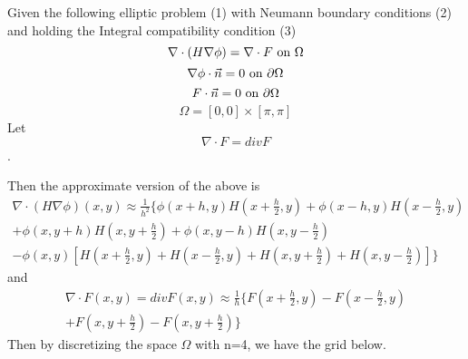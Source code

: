 \documentclass[]{article}
\title{}
\author{}
\begin{document}
\maketitle


Given the following elliptic problem (1) with Neumann boundary conditions (2) and holding the Integral compatibility condition (3)
\begin{equation}
\nabla \cdot(H \nabla \phi) = \nabla \cdot F \textmd{ on } \Omega
\end{equation}
\begin{equation}  \nabla \phi \cdot \vec{n} = 0 \textmd{ on } \partial \Omega 
\end{equation}
\begin{equation} F \cdot \vec{n} = 0 \textmd{ on } \partial \Omega 
\end{equation}
\begin{equation*}
\Omega= [0,0] \times [\pi,\pi]
\end{equation*}
Let  \[ \nabla \cdot F = divF\].

Then the approximate version of the above is
\begin{multline*}
\nabla \cdot(H \nabla \phi) (x,y) \approx \frac 1 {h^2} \Bigg\lbrace 
\phi (x+h,y)H\left(x+\frac h 2,y\right)+\phi(x-h,y)H\left(x-\frac h 2,y\right) \\
+\phi(x,y+h)H\left(x,y+\frac h 2\right)+\phi(x,y-h)H\left(x,y-\frac h2\right)\\
-\phi(x,y)\left[H\left(x+\frac h2,y\right)+H\left(x- \frac h2,y\right)+ H\left(x,y+\frac h2\right)+H\left(x,y- \frac h2 \right)\right]
\Bigg\rbrace
\end{multline*}
and
\begin{multline}
\nabla \cdot F(x,y)=divF(x,y) \approx \frac 1 h \Bigg\lbrace F\left(x+\frac h 2,y\right) -F\left(x-\frac h 2,y\right)\\ +F\left(x,y+\frac h 2\right) - F\left(x,y+\frac h 2\right)\Bigg\rbrace
\end{multline}
Then by discretizing the space $\Omega$ with n=4, we have the grid below.
\end{document}
